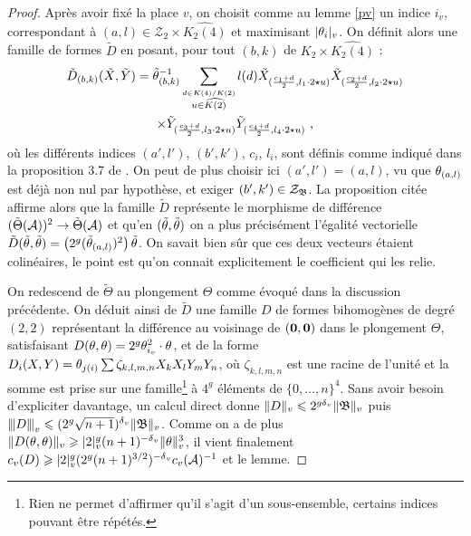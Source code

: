 \documentclass{mpg-preth}
\begin{document}
\begin{proof}
  Après avoir fixé la place $v$, on choisit comme au lemme \ref{pv} un indice
  $i_v$, correspondant à $(a, l) \in \mathcal{Z}_2 \times \widehat{K_2(4)}$ et
  maximisant $\lvert\theta_i\rvert_{v}$. On définit alors une famille de formes $\tilde{D}$
  en posant, pour tout $(b, k)$ de $K_2 \times \widehat{K_2(4)}$ :
  \begin{multline*}
  \tilde{D}_{(b, k)}(\tilde{X}, \tilde{Y}) = \tilde{\theta}_{(b, k)}^{-1}
  \sum_{\stackrel{d \in K(4)/K(2)}{u \in \widehat{K(2)}}} l(d)
  \tilde{X}_{(\frac{c_1+d}{2}, l_1\cdot2\star u)}
  \tilde{X}_{(\frac{c_2+d}{2}, l_2\cdot2\star u)} \\\times
  \tilde{Y}_{(\frac{c_3+d}{2}, l_3\cdot2\star u)}
  \tilde{Y}_{(\frac{c_4+d}{2}, l_4\cdot2\star u)} \text{ ,}
  \end{multline*}
  où les différents indices $(a', l')$, $(b', k')$, $c_i$, $l_i$, sont définis
  comme indiqué dans la proposition 3.7 de \cite{daphimhva2}. On peut de
  plus choisir ici $(a', l')= (a, l)$, vu que $\theta_{(a, l)}$ est déjà non nul
  par hypothèse, et exiger $(b', k') \in \mathcal{Z}_{\mathfrak{B}}$. La proposition
  citée affirme alors que la famille $\tilde{D}$ représente le morphisme de
  différence $(\tilde\Theta(\mathcal{A}))^2 \to \tilde\Theta(\mathcal{A})$ et qu'en
  $(\tilde{\theta}, \tilde{\theta})$ on a plus précisément l'égalité vectorielle
  $\tilde{D}(\tilde{\theta}, \tilde{\theta}) = \left( 2^g (\tilde{\theta}_{(a,
    l)})^2\right) \tilde{\theta}$. On savait bien sûr que ces deux vecteurs
  étaient colinéaires, le point est qu'on connait explicitement le coefficient
  qui les relie.

  On redescend de $\tilde\Theta$ au plongement $\Theta$ comme évoqué dans la
  discussion précédente. On déduit ainsi de $\tilde D$ une famille $D$ de
  formes bihomogènes de degré $(2, 2)$ représentant la différence au voisinage
  de $({\boldsymbol{0}}, {\boldsymbol{0}})$ dans le plongement $\Theta$, satisfaisant $D(\theta, \theta) =
  2^g \theta_{i_v}^2 \cdot \theta$, et de la forme $D_i(X, Y)= \theta_{j(i)} \sum
  \zeta_{k,l,m,n} X_kX_lY_mY_n$, où $\zeta_{k,l,m,n}$ est une racine de
  l'unité et la somme est prise sur une famille\footnote{Rien ne permet  d'affirmer qu'il s'agit d'un sous-ensemble, certains indices
  pouvant être répétés.} à $4^g$ éléments de $\{0, \dots, n\}^4$. Sans avoir
  besoin d'expliciter davantage, un calcul direct donne $\lVert D\rVert_{v} \leqslant 2^{g{\delta\smash{_v}}}
  \lVert\mathfrak{B}\rVert_{v}$ puis $\left\lvert\hspace{-1pt}\left\lvert\hspace{-1pt} \left\lvert D\right\rvert \hspace{-1pt}\right\rvert\hspace{-1pt}\right\rvert_{v} \leqslant (2^g\sqrt{n+1})^{\delta\smash{_v}} \lVert\mathfrak{B}\rVert_{v}$. Comme on a de plus
  $\lVert D(\theta, \theta)\rVert_{v} \geqslant \lvert2\rvert_{v}^g(n+1)^{-{\delta\smash{_v}}}\lVert\theta\rVert_{v}^3$, il vient finalement
  $c_v(D) \geqslant \lvert2\rvert_{v}^g (2^g(n+1)^{3/2})^{-{\delta\smash{_v}}} c_v(\mathcal{A})^{-1}$ et le lemme.
\end{proof}
\end{document}
